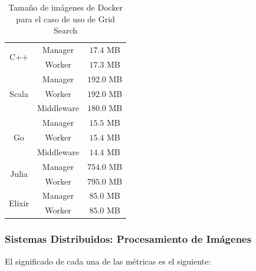 \documentclass[11pt]{article}
\let\Oldsubsubsection\subsubsection
\renewcommand{\subsubsection}{\FloatBarrier\Oldsubsubsection}
\begin{document}
\begin{table}[H]
\centering
\begin{tabular}{|ccc|}
\hline
\multicolumn{1}{|c|}{\multirow{2}{*}{C++}} & \multicolumn{1}{c|}{Manager} & $17.4$ MB \\ \cline{2-3} 
\multicolumn{1}{|c|}{} & \multicolumn{1}{c|}{Worker} & $17.3$ MB \\ \hline
\multicolumn{1}{|c|}{\multirow{3}{*}{Scala}} & \multicolumn{1}{c|}{Manager} & $192.0$ MB \\ \cline{2-3} 
\multicolumn{1}{|c|}{} & \multicolumn{1}{c|}{Worker} & $192.0$ MB \\ \cline{2-3} 
\multicolumn{1}{|c|}{} & \multicolumn{1}{c|}{Middleware} & $180.0$ MB \\ \hline
\multicolumn{1}{|c|}{\multirow{3}{*}{Go}} & \multicolumn{1}{c|}{Manager} & $15.5$ MB \\ \cline{2-3} 
\multicolumn{1}{|c|}{} & \multicolumn{1}{c|}{Worker} & $15.4$ MB \\ \cline{2-3} 
\multicolumn{1}{|c|}{} & \multicolumn{1}{c|}{Middleware} & $14.4$ MB \\ \hline
\multicolumn{1}{|c|}{\multirow{2}{*}{Julia}} & \multicolumn{1}{c|}{Manager} & $754.0$ MB \\ \cline{2-3} 
\multicolumn{1}{|c|}{} & \multicolumn{1}{c|}{Worker} & $795.0$ MB \\ \hline
\multicolumn{1}{|c|}{\multirow{2}{*}{Elixir}} & \multicolumn{1}{c|}{Manager} & $85.0$ MB \\ \cline{2-3} 
\multicolumn{1}{|c|}{} & \multicolumn{1}{c|}{Worker} & $85.0$ MB \\ \hline
\end{tabular}
\caption{Tamaño de imágenes de Docker para el caso de uso de Grid Search}
\end{table}

\subsubsection{Sistemas Distribuidos: Procesamiento de Imágenes} \label{sec:anex:metrics:ip}

El significado de cada una de las métricas es el siguiente:
\end{document}
